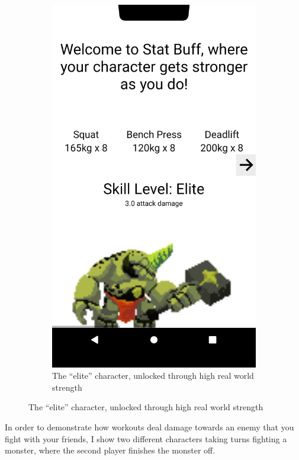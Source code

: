\documentclass{l4proj}
\begin{document}
\begin{figure}[H]
\begin{subfigure}{0.45\textwidth}
        \includegraphics[width=\textwidth]{elite.png}
        \caption{The ``elite'' character, unlocked through high real world strength} 
    \end{subfigure}
\end{figure}

\newpage
In order to demonstrate how workouts deal damage towards an enemy that you fight with your friends, I show two different characters taking turns fighting a monster, where the second player finishes the monster off.
\end{document}
